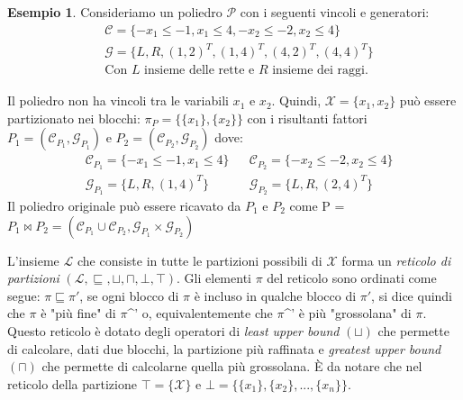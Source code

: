 \documentclass{mimosis}
\theoremstyle{definition}
\newtheorem{exmp}{Esempio}[section]
\begin{document}
\begin{exmp}
  Consideriamo un poliedro $\mathcal{P}$ con i seguenti vincoli e generatori:
  \begin{align*}
    &\mathcal{C} = \{-x_{1} \le -1, x_{1} \le 4, -x_{2} \le -2, x_{2} \le 4\} \\
    &\mathcal{G} = \{\mathit{L}, \mathit{R}, (1,2)^T, (1,4)^T, (4,2)^T, (4,4)^T\} \\
    &\text{Con } \mathit{L} \text{ insieme delle rette e } \mathit{R} \text{ insieme dei raggi.}
  \end{align*}

  Il poliedro non ha vincoli tra le variabili $x_1$ e $x_2$. Quindi, $\mathcal{X} = \{x_1,x_2\}$
  può essere partizionato nei blocchi: $\pi_P = \{\{x_1\}, \{x_2\}\}$ con i risultanti fattori
  $P_1 = (\mathcal{C}_{P_1}, \mathcal{G}_{P_1})$ e $P_2 = (\mathcal{C}_{P_2}, \mathcal{G}_{P_2})$ dove:
  \begin{align*}
      &\mathcal{C}_{P_{1}} = \{-x_{1} \le -1, x_{1} \le 4\}  &&\mathcal{C}_{P_{2}} = \{ -x_{2} \le -2, x_{2} \le 4\} \\
      &\mathcal{G}_{P_{1}} = \{\mathit{L}, \mathit{R}, (1,4)^T\} &&\mathcal{G}_{P_{2}} = \{\mathit{L}, \mathit{R}, (2,4)^T\}
  \end{align*}
  Il poliedro originale può essere ricavato da $P_{1}$ e $P_{2}$ come
  P = $P_{1} \bowtie P_{2} = (\mathcal{C}_{P_{1}} \cup \mathcal{C}_{P_{2}}, \mathcal{G}_{P_{1}} \times \mathcal{G}_{P_{2}})$
\end{exmp}

L'insieme \(\mathcal{L}\) che consiste in tutte le partizioni possibili di \(\mathcal{X}\)
forma un \emph{reticolo di partizioni} \((\mathcal{L}, \sqsubseteq, \sqcup, \sqcap,
\bot, \top)\). Gli elementi \(\pi\) del reticolo sono ordinati come segue: \(\pi
\sqsubseteq \pi'\), se ogni blocco di \(\pi\) è incluso in qualche blocco di
\(\pi'\), si dice quindi che \(\pi\) è "più fine" di \(\pi\)\^{}' o, equivalentemente che
\(\pi\)\^{}' è più "grossolana" di \(\pi\). Questo reticolo è dotato degli operatori di \emph{least upper bound}
\((\sqcup)\) che permette di calcolare, dati due blocchi, la partizione più
raffinata e \emph{greatest upper bound} \((\sqcap)\) che permette di calcolarne quella
più grossolana. È da notare che nel reticolo della
partizione \(\top = \{\mathcal{X}\}\) e \(\bot = \{\{x_1\}, \{x_2\}, ..., \{x_n\}\}\).
\end{document}
